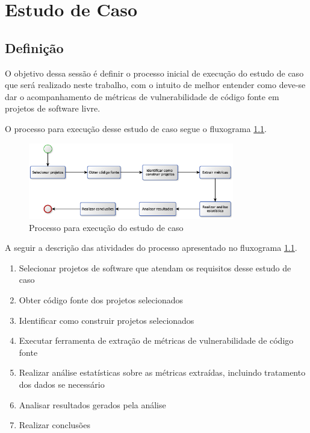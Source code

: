 \chapter{Estudo de Caso} \label{estudodecaso}

\section{Definição} \label{definicao_estudo}

O objetivo dessa sessão é definir o processo inicial de execução do estudo de caso que será realizado neste trabalho, com o intuito 
de melhor entender como deve-se dar o acompanhamento de métricas de vulnerabilidade de código fonte em projetos de software
livre. 

O processo para execução desse estudo de caso segue o fluxograma \ref{processo_estudo_de_caso}.

\begin{figure}[h]
  \centering
  \includegraphics[width=0.8\textwidth]
      {figuras/estudo_de_caso_processo.eps}
  \caption{Processo para execução do estudo de caso}
  \label{processo_estudo_de_caso}
\end{figure}

A seguir a descrição das atividades do processo apresentado no fluxograma \ref{processo_estudo_de_caso}.

\begin{enumerate}\label{desc_processo}
  \item Selecionar projetos de software que atendam os requisitos desse estudo de caso
  \item Obter código fonte dos projetos selecionados
  \item Identificar como construir projetos selecionados 
  \item Executar ferramenta de extração de métricas de vulnerabilidade de código fonte
  \item Realizar análise estatísticas sobre as métricas extraídas, incluindo tratamento dos dados se necessário
  \item Analisar resultados gerados pela análise
  \item Realizar conclusões
\end{enumerate}

